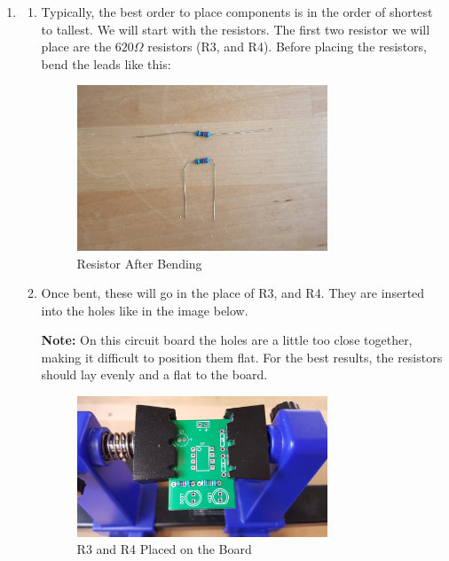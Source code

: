 \documentclass{article}
\begin{document}
    
    \begin{enumerate}
  
      \item 
        
    \begin{enumerate}
  
          \item 
        Typically, the best order to place components is in the order of shortest to tallest. We will start with the resistors. The first two resistor we will place
        are the $620\Omega$ resistors (R3, and R4). Before placing the resistors, bend the leads like this:
        
\begin{figure}[H]
\caption{ Resistor After Bending }
\label{fig:img/0008.jpg}
\centering
\includegraphics[width=0.75\textwidth]{img/0008.jpg}
\end{figure}

        \item 
        Once bent, these will go in the place of R3, and R4. They are inserted into the holes like in the image below.

        \textbf{Note:} On this circuit board the holes are a little too close together, making it difficult to position
         them flat. For the best results, the resistors
        should lay evenly and a flat to the board.
        
\begin{figure}[H]
\caption{ R3 and R4 Placed on the Board }
\label{fig:img/0005.jpg}
\centering
\includegraphics[width=0.75\textwidth]{img/0005.jpg}
\end{figure}


\end{enumerate}
\end{enumerate}
\end{document}
